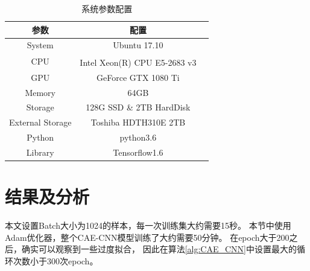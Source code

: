 \begin{table}[H]
	\centering
	\caption{系统参数配置}
	\begin{tabular}{|c|c|c|}
		\hline
		参数 & 配置\\ \hline
		System & Ubuntu 17.10\\ \hline
		CPU & Intel\textsuperscript{\textregistered}  Xeon(R) CPU E5-2683 v3 \\ \hline
		GPU & GeForce GTX 1080 Ti\\ \hline
		Memory & 64GB\\ \hline
		Storage & 128G SSD \& 2TB HardDisk\\ \hline
		External Storage & Toshiba HDTH310E 2TB\\ \hline
		Python & python3.6\\ \hline
		Library & Tensorflow1.6\\ \hline
	\end{tabular}
	\label{sec:table_3_1}  
\end{table}
%

\section{结果及分析}
本文设置Batch大小为1024的样本，每一次训练集大约需要15秒。
本节中使用Adam优化器，整个CAE-CNN模型训练了大约需要50分钟。
在epoch大于200之后，确实可以观察到一些过度拟合，
因此在算法\ref{alg:CAE_CNN}中设置最大的循环次数小于300次epoch。\par

